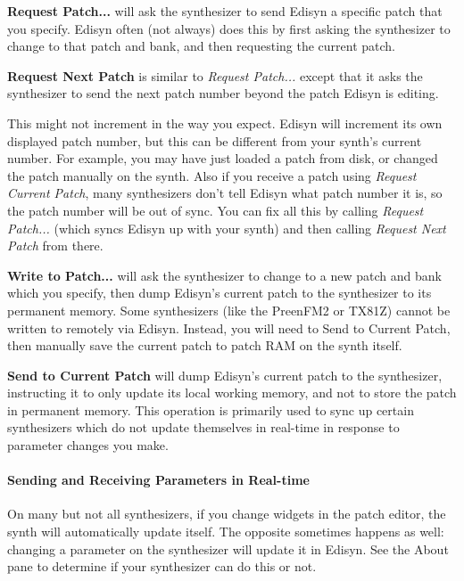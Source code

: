 \documentclass{article}
\begin{document}
{\bf Request Patch...} will ask the synthesizer to send Edisyn a specific patch that you specify.  Edisyn often (not always) does this by first asking the synthesizer to change to that patch and bank, and then requesting the current patch.

{\bf Request Next Patch} is similar to {\it Request Patch...} except that it asks the synthesizer to send the next patch number beyond the patch Edisyn is editing.  

This might not increment in the way you expect.  Edisyn will increment its own displayed patch number, but this can be different from your synth's current number.  For example, you may have just loaded a patch from disk, or changed the patch manually on the synth.  Also if you receive a patch using {\it Request Current Patch}, many synthesizers don't tell Edisyn what patch number it is, so the patch number will be out of sync.  You can fix all this by calling {\it Request Patch...} (which syncs Edisyn up with your synth) and then calling {\it Request Next Patch} from there.

{\bf Write to Patch...} will ask the synthesizer to change to a new patch and bank which you specify, then dump Edisyn's current patch to the synthesizer to its permanent memory.  Some synthesizers (like the PreenFM2 or TX81Z) cannot be written to remotely via Edisyn. Instead, you will need to Send to Current Patch, then manually save the current patch to patch RAM on the synth itself.

{\bf Send to Current Patch} will dump Edisyn's current patch to the synthesizer, instructing it to only update its local working memory, and not to store the patch in permanent memory.  This operation is primarily used to sync up certain synthesizers which do not update themselves in real-time in response to parameter changes you make.


\paragraph{Sending and Receiving Parameters in Real-time}
On many but not all synthesizers, if you change widgets in the patch editor, the synth will automatically update itself.   The opposite sometimes happens as well: changing a parameter on the synthesizer will update it in Edisyn.  See the About pane to determine if your synthesizer can do this or not.
\end{document}
